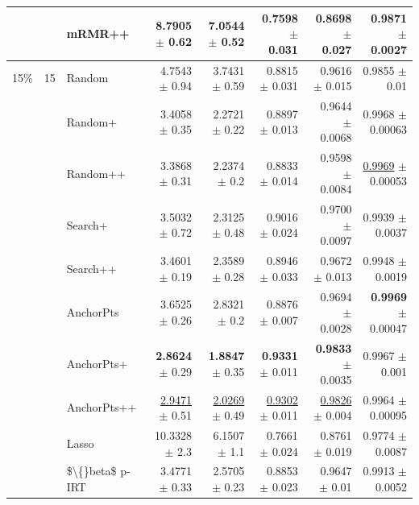 \begin{longtable}{llp{}rrrrr}
 &  & mRMR++ & 8.7905 {\scriptsize $\pm$ 0.62} & 7.0544 {\scriptsize $\pm$ 0.52} & 0.7598 {\scriptsize $\pm$ 0.031} & 0.8698 {\scriptsize $\pm$ 0.027} & 0.9871 {\scriptsize $\pm$ 0.0027} \\
\midrule
15\% & 15 & Random & 4.7543 {\scriptsize $\pm$ 0.94} & 3.7431 {\scriptsize $\pm$ 0.59} & 0.8815 {\scriptsize $\pm$ 0.031} & 0.9616 {\scriptsize $\pm$ 0.015} & 0.9855 {\scriptsize $\pm$ 0.01} \\
 &  & Random+ & 3.4058 {\scriptsize $\pm$ 0.35} & 2.2721 {\scriptsize $\pm$ 0.22} & 0.8897 {\scriptsize $\pm$ 0.013} & 0.9644 {\scriptsize $\pm$ 0.0068} & 0.9968 {\scriptsize $\pm$ 0.00063} \\
 &  & Random++ & 3.3868 {\scriptsize $\pm$ 0.31} & 2.2374 {\scriptsize $\pm$ 0.2} & 0.8833 {\scriptsize $\pm$ 0.014} & 0.9598 {\scriptsize $\pm$ 0.0084} & \underline{0.9969} {\scriptsize $\pm$ 0.00053} \\
 &  & Search+ & 3.5032 {\scriptsize $\pm$ 0.72} & 2.3125 {\scriptsize $\pm$ 0.48} & 0.9016 {\scriptsize $\pm$ 0.024} & 0.9700 {\scriptsize $\pm$ 0.0097} & 0.9939 {\scriptsize $\pm$ 0.0037} \\
 &  & Search++ & 3.4601 {\scriptsize $\pm$ 0.19} & 2.3589 {\scriptsize $\pm$ 0.28} & 0.8946 {\scriptsize $\pm$ 0.033} & 0.9672 {\scriptsize $\pm$ 0.013} & 0.9948 {\scriptsize $\pm$ 0.0019} \\
 &  & AnchorPts & 3.6525 {\scriptsize $\pm$ 0.26} & 2.8321 {\scriptsize $\pm$ 0.2} & 0.8876 {\scriptsize $\pm$ 0.007} & 0.9694 {\scriptsize $\pm$ 0.0028} & \textbf{0.9969} {\scriptsize $\pm$ 0.00047} \\
 &  & AnchorPts+ & \textbf{2.8624} {\scriptsize $\pm$ 0.29} & \textbf{1.8847} {\scriptsize $\pm$ 0.35} & \textbf{0.9331} {\scriptsize $\pm$ 0.011} & \textbf{0.9833} {\scriptsize $\pm$ 0.0035} & 0.9967 {\scriptsize $\pm$ 0.001} \\
 &  & AnchorPts++ & \underline{2.9471} {\scriptsize $\pm$ 0.51} & \underline{2.0269} {\scriptsize $\pm$ 0.49} & \underline{0.9302} {\scriptsize $\pm$ 0.011} & \underline{0.9826} {\scriptsize $\pm$ 0.004} & 0.9964 {\scriptsize $\pm$ 0.00095} \\
 &  & Lasso & 10.3328 {\scriptsize $\pm$ 2.3} & 6.1507 {\scriptsize $\pm$ 1.1} & 0.7661 {\scriptsize $\pm$ 0.024} & 0.8761 {\scriptsize $\pm$ 0.019} & 0.9774 {\scriptsize $\pm$ 0.0087} \\
 &  & \$\textbackslash\{\}beta\$ p-IRT & 3.4771 {\scriptsize $\pm$ 0.33} & 2.5705 {\scriptsize $\pm$ 0.23} & 0.8853 {\scriptsize $\pm$ 0.023} & 0.9647 {\scriptsize $\pm$ 0.01} & 0.9913 {\scriptsize $\pm$ 0.0052} \\

\end{longtable}
